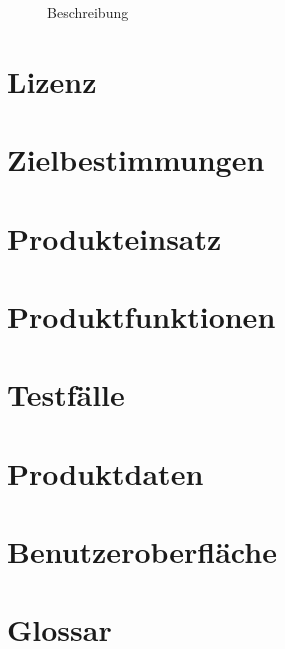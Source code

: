 \documentclass{report}
\begin{document}
	
	\begin{figure}[h]
		\centering
		\caption{Beschreibung}
		\label{fig:x}
	\end{figure}
		
	
	\tableofcontents
	
	\chapter{Lizenz}\label{chp:lizenz}
	
	
	\chapter{Zielbestimmungen}\label{chp:zielbestimmungen}
	
	
	\chapter{Produkteinsatz}\label{chp:produkteinsatz}
	

	\chapter{Produktfunktionen}\label{chp:produktfunktionen}
	

	\chapter{Testfälle}\label{chp:testfaelle}
	
	
	\chapter{Produktdaten}\label{chp:produktdaten}
	
	
	\chapter{Benutzeroberfläche}\label{chp:benutzeroberflaeche}
	
	
	\chapter{Glossar}\label{chp:glossar}
	
	
	
	
\end{document}
